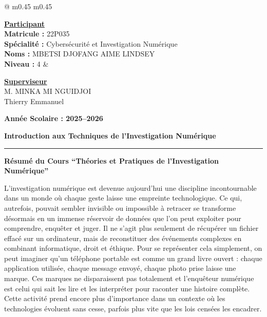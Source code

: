 \documentclass[12pt,a4paper]{article}
\newcommand{\HRule}{\rule{\linewidth}{1pt}}
\begin{document}
	\vspace{2cm}
	
	\begin{tabular*}{\textwidth}{@{\extracolsep{\fill}} m{0.45\textwidth} m{0.45\textwidth} }
		\raggedright
		\uline{\textbf{Participant}} \\[1em]
		\textbf{Matricule :} 22P035 \\[0.8em]
		\textbf{Spécialité :} Cybersécurité et Investigation Numérique \\[0.8em]
		\textbf{Noms :} MBETSI DJOFANG AIME LINDSEY \\[0.8em]
		\textbf{Niveau :} 4
		&
		\raggedright
		\uline{\textbf{Superviseur}} \\[1em]
		M.\hspace{0.5cm} MINKA MI NGUIDJOI \\ 
		\hspace{1.1cm} Thierry Emmanuel
	\end{tabular*}
	
	\vfill
	
	\begin{center}
		\Large \textbf{Année Scolaire : 2025--2026}
	\end{center}
	
	
	\newpage %
	
	
	\begin{flushright}
		\textbf{Introduction aux Techniques de l'Investigation Numérique}
		\HRule 
	\end{flushright} 
	
	\vspace{0.5cm}
	
	\begin{center}
		\Large
		\textbf{Résumé du Cours “Théories et Pratiques de l’Investigation Numérique”} \\[1em]
	\end{center}
	
	\vspace{0.5cm}
	
	
	
	\noindent
	L’investigation numérique est devenue aujourd’hui une discipline incontournable dans un monde où chaque geste laisse une empreinte technologique. Ce qui, autrefois, pouvait sembler invisible ou impossible à retracer se transforme désormais en un immense réservoir de données que l’on peut exploiter pour comprendre, enquêter et juger. Il ne s’agit plus seulement de récupérer un fichier effacé sur un ordinateur, mais de reconstituer des événements complexes en combinant informatique, droit et éthique. Pour se représenter cela simplement, on peut imaginer qu’un téléphone portable est comme un grand livre ouvert : chaque application utilisée, chaque message envoyé, chaque photo prise laisse une marque. Ces marques ne disparaissent pas totalement et l’enquêteur numérique est celui qui sait les lire et les interpréter pour raconter une histoire complète. Cette activité prend encore plus d’importance dans un contexte où les technologies évoluent sans cesse, parfois plus vite que les lois censées les encadrer.
	
\end{document}
